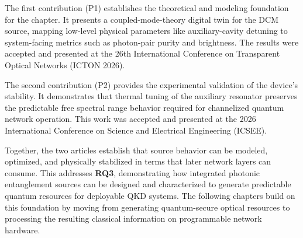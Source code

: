The first contribution (P1) establishes the theoretical and modeling foundation for the chapter. It presents a coupled-mode-theory digital twin for the DCM source, mapping low-level physical parameters like auxiliary-cavity detuning to system-facing metrics such as photon-pair purity and brightness. The results were accepted and presented at the 26th International Conference on Transparent Optical Networks (ICTON 2026).

The second contribution (P2) provides the experimental validation of the device's stability. It demonstrates that thermal tuning of the auxiliary resonator preserves the predictable free spectral range behavior required for channelized quantum network operation. This work was accepted and presented at the 2026 International Conference on Science and Electrical Engineering (ICSEE).

Together, the two articles establish that source behavior can be modeled, optimized, and physically stabilized in terms that later network layers can consume. This addresses \textbf{RQ3}, demonstrating how integrated photonic entanglement sources can be designed and characterized to generate predictable quantum resources for deployable QKD systems. The following chapters build on this foundation by moving from generating quantum-secure optical resources to processing the resulting classical information on programmable network hardware.


